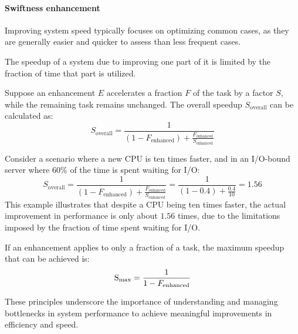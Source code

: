 \paragraph*{Swiftness enhancement}
Improving system speed typically focuses on optimizing common cases, as they are generally easier and quicker to assess than less frequent cases.
\begin{theorem}
    The speedup of a system due to improving one part of it is limited by the fraction of time that part is utilized.
\end{theorem}
Suppose an enhancement $E$ accelerates a fraction $F$ of the task by a factor $S$, while the remaining task remains unchanged.
The overall speedup $S_{\text{overall}}$ can be calculated as:
\[S_{\text{overall}}=\dfrac{1}{\left(1-F_{\text{enhanced}}\right)+\frac{F_{\text{enhanced}}}{S_{\text{enhanced}}}}\]
\begin{example}
    Consider a scenario where a new CPU is ten times faster, and in an I/O-bound server where 60\% of the time is spent waiting for I/O:
    \[S_{\text{overall}}=\dfrac{1}{\left(1-F_{\text{enhanced}}\right)+\frac{F_{\text{enhanced}}}{S_{\text{enhanced}}}}=\dfrac{1}{\left(1-0.4\right)+\frac{0.4}{10}}=1.56\]
    This example illustrates that despite a CPU being ten times faster, the actual improvement in performance is only about $1.56$ times, due to the limitations imposed by the fraction of time spent waiting for I/O.
\end{example}
\begin{corollary}
    If an enhancement applies to only a fraction of a task, the maximum speedup that can be achieved is:
    \[\text{S}_{\max}=\dfrac{1}{1-F_{\textnormal{enhanced}}}\]
\end{corollary}
These principles underscore the importance of understanding and managing bottlenecks in system performance to achieve meaningful improvements in efficiency and speed.

